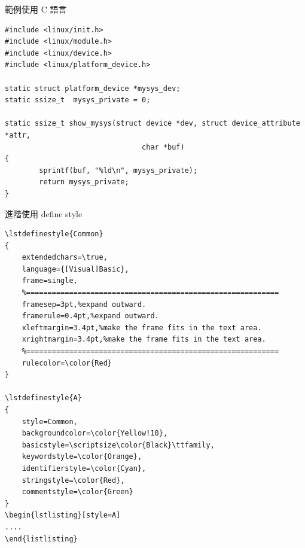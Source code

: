   範例使用 C 語言
  \begin{lstlisting}
#include <linux/init.h>
#include <linux/module.h>
#include <linux/device.h>
#include <linux/platform_device.h>

static struct platform_device *mysys_dev;
static ssize_t  mysys_private = 0;

static ssize_t show_mysys(struct device *dev, struct device_attribute *attr,
                                char *buf)
{
        sprintf(buf, "%ld\n", mysys_private);
        return mysys_private;
}
  \end{lstlisting}
  進階使用 define style
  \begin{verbatim}
\lstdefinestyle{Common}
{
    extendedchars=\true,
    language={[Visual]Basic},
    frame=single,
    %===========================================================
    framesep=3pt,%expand outward.
    framerule=0.4pt,%expand outward.
    xleftmargin=3.4pt,%make the frame fits in the text area. 
    xrightmargin=3.4pt,%make the frame fits in the text area.
    %=========================================================== 
    rulecolor=\color{Red}
}

\lstdefinestyle{A}
{
    style=Common,
    backgroundcolor=\color{Yellow!10},
    basicstyle=\scriptsize\color{Black}\ttfamily,
    keywordstyle=\color{Orange},
    identifierstyle=\color{Cyan},
    stringstyle=\color{Red},
    commentstyle=\color{Green}
}
\begin{lstlisting}[style=A]
....
\end{listlisting}
  \end{verbatim}

